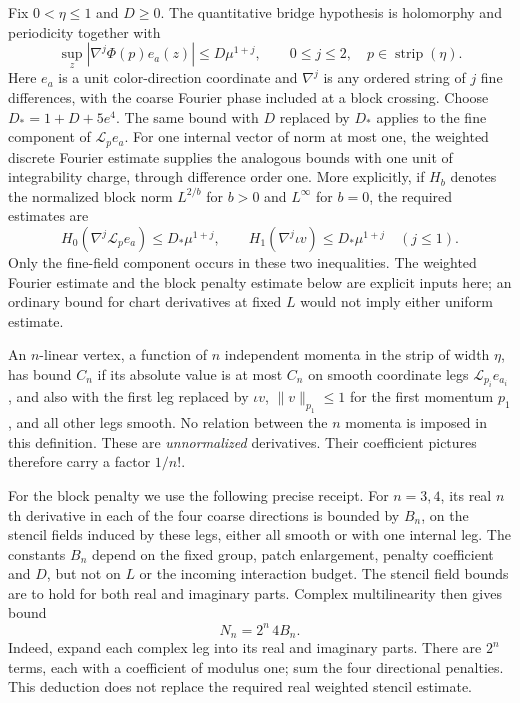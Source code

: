 Fix $0<\eta\leq1$ and $D\geq0$. The quantitative bridge hypothesis is
holomorphy and periodicity together with
\begin{equation}\label{eq:ex-vertex-cruise}
 \sup_z|\nabla^{j}\Phi(p)e_a(z)|\leq D\mu^{1+j},
 \qquad 0\leq j\leq2,\quad p\in\operatorname{strip}(\eta).
\end{equation}
Here $e_a$ is a unit color-direction coordinate and $\nabla^j$ is any
ordered string of $j$ fine differences, with the coarse Fourier phase
included at a block crossing. Choose $D_*=1+D+5e^4$. The same bound with $D$ replaced by
$D_*$ applies to the fine component of $\mathcal L_pe_a$.
For one internal vector of norm at most one, the weighted discrete
Fourier estimate supplies the analogous bounds with one unit of
integrability charge, through difference order one. More explicitly,
if $H_b$ denotes the normalized block norm $L^{2/b}$ for $b>0$ and
$L^\infty$ for $b=0$, the required estimates are
\[
 H_0(\nabla^j\mathcal L_pe_a)\leq D_*\mu^{1+j},\qquad
 H_1(\nabla^j\iota v)\leq D_*\mu^{1+j}\quad(j\leq1).
\]
Only the fine-field component occurs in these two inequalities.
The weighted Fourier estimate and the block penalty estimate below are
explicit inputs here; an ordinary bound for chart derivatives at fixed
$L$ would not imply either uniform estimate.

An $n$-linear vertex, a function of $n$ independent momenta in the
strip of width $\eta$, has bound $C_n$ if its absolute value is at most
$C_n$ on smooth coordinate legs $\mathcal L_{p_i}e_{a_i}$, and also with
the first leg replaced by $\iota v$, $\|v\|_{p_1}\leq1$ for the first
momentum $p_1$, and all other legs smooth. No relation between the $n$
momenta is imposed in this definition. These are
\emph{unnormalized} derivatives. Their coefficient pictures therefore
carry a factor $1/n!$.

For the block penalty we use the following precise receipt. For $n=3,4$,
its real $n$th derivative in each of the four coarse directions is bounded
by $B_n$, on the stencil fields induced by these legs, either all smooth
or with one internal leg. The constants $B_n$ depend on the fixed group,
patch enlargement, penalty coefficient and $D$, but not on $L$ or the
incoming interaction budget. The stencil field bounds are to hold for
both real and imaginary parts. Complex multilinearity then gives bound
\begin{equation}\label{eq:ex-vertex-penalty-price}
                    N_n=2^n\,4B_n.
\end{equation}
Indeed, expand each complex leg into its real and imaginary parts.
There are $2^n$ terms, each with a coefficient of modulus one; sum the
four directional penalties. This deduction does not replace the required
real weighted stencil estimate.

